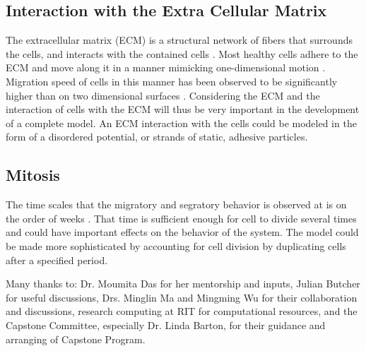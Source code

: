 \documentclass[aps,prb,twocolumn,groupedaddress,nofootinbib,floatfix]{revtex4}
\begin{document}
\subsection{Interaction with the Extra Cellular Matrix}
The extracellular matrix (ECM) is a structural network of fibers that surrounds the cells, and interacts with the contained cells \cite{Alberts}.
Most healthy cells adhere to the ECM and move along it in a manner mimicking one-dimensional motion \cite{Cukierman}.
Migration speed of cells in this manner has been observed to be significantly higher than on two dimensional surfaces \cite{Doyle}.
Considering the ECM and the interaction of cells with the ECM will thus be very important in the development of a complete model.
An ECM interaction with the cells could be modeled in the form of a disordered potential, or strands of static, adhesive particles.

\subsection{Mitosis}

The time scales that the migratory and segratory behavior is observed at is on the order of weeks \cite{Mingming}.
That time is sufficient enough for cell to divide several times and could have important effects on the behavior of the system.
The model could be made more sophisticated by accounting for cell division by duplicating cells after a specified period.

\begin{acknowledgments}
Many thanks to: Dr. Moumita Das for her mentorship and inputs, Julian Butcher for useful discussions, Drs. Minglin Ma and Mingming Wu for their collaboration and discussions, research computing at RIT for computational resources, and the Capstone Committee, especially Dr. Linda Barton, for their guidance and arranging of Capstone Program.
\end{acknowledgments}

\vspace{0.6in}
%
%



\end{document}
